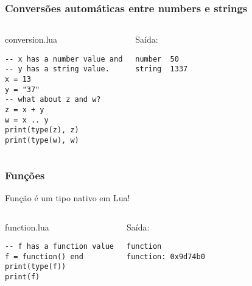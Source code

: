 \documentclass[brazil]{beamer}
\begin{document}
\begin{frame}[fragile]
  \frametitle{Conversões automáticas entre numbers e strings}
  \pause
  \begin{columns}
      \begin{block}{conversion.lua}
        \begin{lstlisting}
-- x has a number value and
-- y has a string value.
x = 13
y = "37"
-- what about z and w?
z = x + y
w = x .. y
print(type(z), z)
print(type(w), w)
        \end{lstlisting}
      \end{block}
    \pause
      \begin{block}{Saída:}
        \begin{verbatim}
number  50
string  1337  \end{verbatim}
      \end{block}
  \end{columns}
\end{frame}


\begin{frame}[fragile]
  \frametitle{Funções}
  \pause
  \begin{center}
    Função é um tipo nativo em Lua!
  \end{center}
  \pause
  \begin{columns}
      \begin{block}{function.lua}
        \begin{lstlisting}
-- f has a function value
f = function() end
print(type(f))
print(f)
        \end{lstlisting}
      \end{block}
    \pause
      \begin{block}{Saída:}
        \begin{verbatim}
function
function: 0x9d74b0  \end{verbatim}
      \end{block}
  \end{columns}
\end{frame}

\end{document}

